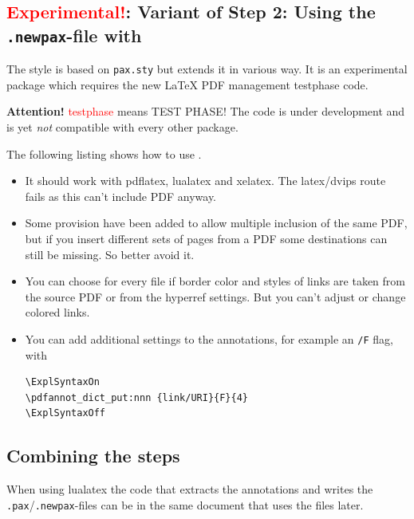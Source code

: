 \documentclass[DIV=12,parskip=half-,bibliography=totoc]{scrartcl}
\begin{document}


\subsection[Alternative Step 2: Using the \texttt{.newpax}-file with \pkg{newpax.sty}]
{\textcolor{red}{Experimental!}: Variant of Step 2: Using the \texttt{.newpax}-file with }


The style  is based on \texttt{pax.sty} but extends it in various way. It is an experimental package which requires the new \LaTeX{} PDF management testphase code.

\textbf{Attention!} \textcolor{red}{testphase} means TEST PHASE! The code is under development and is 
yet \emph{not} compatible with every other package.

The following listing shows how to use .

\begin{itemize}
\item It should work with pdflatex, lualatex and xelatex. The latex/dvips route fails as this can't include PDF anyway.
\item Some provision have been added to allow multiple inclusion of the same PDF, but if you insert different sets of pages from a PDF some destinations can still be missing. So better avoid it.
\item You can choose for every file if border color and styles of links are taken from the source PDF or from the hyperref settings. But you can't adjust or change colored links.
\item You can add additional settings to the annotations, for example an \texttt{/F} flag, with

\begin{lstlisting}
\ExplSyntaxOn
\pdfannot_dict_put:nnn {link/URI}{F}{4}
\ExplSyntaxOff
\end{lstlisting}

\end{itemize}




\subsection{Combining the steps}

When using lualatex the code that extracts the annotations and writes the \texttt{.pax}/\texttt{.newpax}-files can be in the same document that uses the files later.
\end{document}
